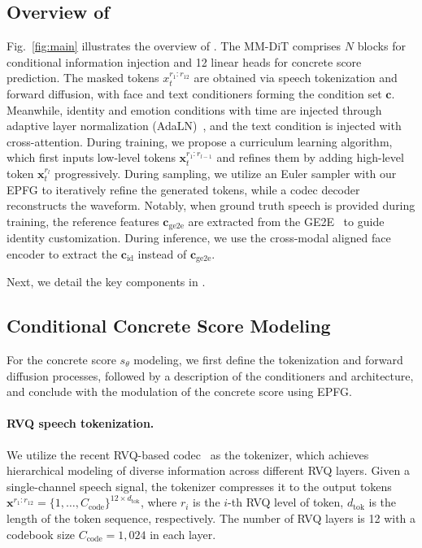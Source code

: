\subsection{Overview of \methodname}
\label{subsec:overview}
Fig.~\ref{fig:main} illustrates the overview of \methodname. The MM-DiT comprises $N$ blocks for conditional information injection and 12 linear heads for concrete score prediction. The masked tokens $x_t^{r_1:r_{12}}$ are obtained via speech tokenization and forward diffusion, with face and text conditioners forming the condition set $\bm{c}$. 
Meanwhile, identity and emotion conditions with time are injected through adaptive layer normalization (AdaLN)~\cite{DiT:conf/iccv/PeeblesX23}, and the text condition is injected with cross-attention. 
During training, we propose a curriculum learning algorithm, which first inputs low-level tokens $\bm{x}_t^{r_1:r_{l-1}}$ and refines them by adding high-level token $\bm{x}_t^{r_{l}}$ progressively. 
During sampling, we utilize an Euler sampler with our EPFG to iteratively refine the generated tokens, while a codec decoder reconstructs the waveform.
Notably, when ground truth speech is provided during training, the reference features $\bm{c}_\text{ge2e}$ are extracted from the GE2E~\cite{GE2E/WanWPL18} to guide identity customization. During inference, we use the cross-modal aligned face encoder to extract the $\bm{c}_\text{id}$ instead of $\bm{c}_\text{ge2e}$. 

Next, we detail the key components in \methodname.

\subsection{Conditional Concrete Score Modeling}
\label{subsec:f2a}
For the concrete score $s_\theta$ modeling, we first define the tokenization and forward diffusion processes, followed by a description of the conditioners and architecture, and conclude with the modulation of the concrete score using EPFG. 

\paragraph{RVQ speech tokenization.~~\xspace}
We utilize the recent RVQ-based codec~\cite{maskgct:journals/corr/abs-2409-00750} as the tokenizer, which achieves hierarchical modeling of diverse information across different RVQ layers. Given a single-channel speech signal, the tokenizer compresses it to the output tokens $\bm{x}^{r_1:r_{12}} = \{1,\ldots,C_\text{code}\}^{12\times d_\text{tok}}$, where $r_i$ is the $i$-th RVQ level of token, $d_\text{tok}$ is the length of the token sequence, respectively. The number of RVQ layers is 12 with a codebook size $C_\text{code}=1,024$ in each layer. 


